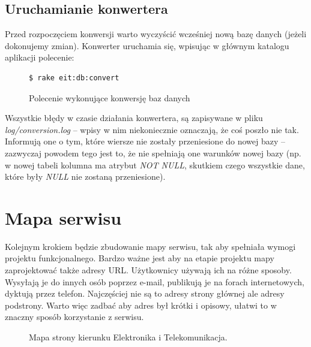 \documentclass[a4paper,12pt,oneside]{report}
\begin{document}
\subsection{Uruchamianie konwertera}
\label{sub:conv-run}

Przed rozpoczęciem konwersji warto wyczyścić wcześniej nową bazę danych (jeżeli dokonujemy zmian). Konwerter uruchamia się, wpisując w głównym katalogu aplikacji polecenie:
\begin{figure}
\centering
\begin{verbatim}$ rake eit:db:convert\end{verbatim}
\caption{Polecenie wykonujące konwersję baz danych\label{fig:raketask}}
\end{figure}
Wszystkie błędy w czasie działania konwertera, są zapisywane w pliku \emph{log/conversion.log} -- wpisy w nim niekoniecznie oznaczają, że coś poszło nie tak. Informują one o tym, które wiersze nie zostały przeniesione do nowej bazy -- zazwyczaj powodem tego jest to, że nie spełniają one warunków nowej bazy (np. w nowej tabeli kolumna ma atrybut \emph{NOT NULL}, skutkiem czego wszystkie dane, które były \emph{NULL} nie zostaną przeniesione).

\section{Mapa serwisu}
\label{sec:mapa}
Kolejnym krokiem będzie zbudowanie mapy serwisu, tak aby spełniała wymogi projektu funkcjonalnego. Bardzo ważne jest aby na etapie projektu mapy zaprojektować także adresy URL. Użytkownicy używają ich na różne sposoby. Wysyłają je do innych osób poprzez e-mail, publikują je na forach internetowych, dyktują przez telefon. Najczęściej nie są to adresy strony głównej ale adresy podstrony. Warto więc zadbać aby adres był krótki i opisowy, ułatwi to w znaczny sposób korzystanie z serwisu.

\newpage
\thispagestyle{empty}
\addtolength{\textwidth}{4cm}
\addtolength{\hoffset}{-2.5cm}
\addtolength{\textheight}{5cm}
\addtolength{\voffset}{-3.5cm}
\begin{landscape}
\begin{figure}
\centering
  \caption{
  Mapa strony kierunku Elektronika i Telekomunikacja.
  \label{fig:eitmap}
  }
\end{figure}
\end{landscape}
\newpage
\addtolength{\textwidth}{-4cm}
\addtolength{\hoffset}{2.5cm}
\addtolength{\textheight}{-5cm}
\addtolength{\voffset}{3.5cm}
\end{document}
